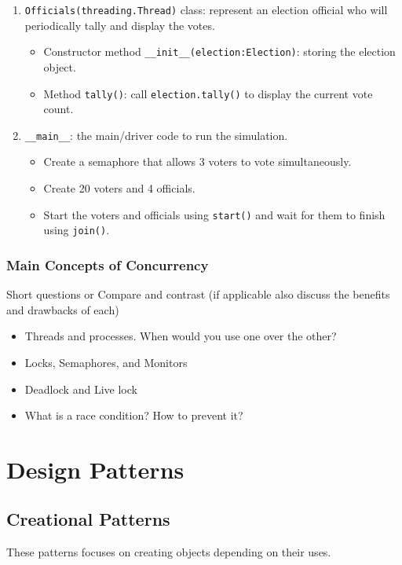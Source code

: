\documentclass[oneside,11pt,dvipsnames]{book}
\newcommand{\code}[1]{\texttt{#1}}
\begin{document}
\begin{enumerate}
\item \code{Officials(threading.Thread)} class: represent an election official who will periodically tally and display the votes.
\begin{itemize}
    \item Constructor method \code{\_\_init\_\_(election:Election)}: storing the election object.
    \item Method \code{tally()}: call \code{election.tally()} to display the current vote count.
\end{itemize}
\item \code{\_\_main\_\_}: the main/driver code to run the simulation.
    \begin{itemize}
        \item Create a semaphore that allows 3 voters to vote simultaneously.
        \item Create 20 voters and 4 officials.
        \item Start the voters and officials using \code{start()} and wait for them to finish using \code{join()}.
    \end{itemize}
\end{enumerate}

\subsection{Main Concepts of Concurrency}\label{exercise:concurrency-concepts}

Short questions or Compare and contrast (if applicable also discuss the benefits and drawbacks of each) 
\begin{itemize}
    \item Threads and processes. When would you use one over the other?
    \item Locks, Semaphores, and Monitors
    \item Deadlock and Live lock
    \item What is a race condition? How to prevent it?
\end{itemize}


\chapter{Design Patterns}

\section{Creational Patterns}
These patterns focuses on creating objects depending on their uses. 
\end{document}
